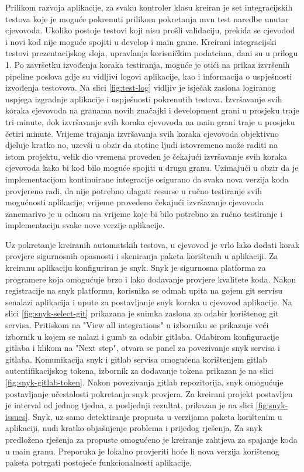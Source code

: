 \documentclass[a4paper,12pt,oneside]{article}
\begin{document}
Prilikom razvoja aplikacije, za svaku kontroler klasu kreiran je set integracijskih testova koje je moguće pokrenuti prilikom pokretanja mvn test naredbe unutar cjevovoda. Ukoliko postoje testovi koji nisu prošli validaciju, prekida se cjevodod i novi kod nije moguće spojiti u develop i main grane. Kreirani integracijski testovi prezentacijskog sloja, upravlanja korisničkim podatcima, dani su u prilogu 1. Po završetku izvođenja koraka testiranja, moguće je otići na prikaz izvršenih pipeline poslova gdje su vidljivi logovi aplikacije, kao i informacija o uspješnosti izvođenja testovova. Na slici \ref{fig:test-log} vidljiv je isječak zaslona logiranog uspjega izgradnje aplikacije i uspješnosti pokrenutih testova. Izvršavanje svih koraka cjevovoda na granama novih značajki i development grani u prosjeku traje tri minute, dok izvršavanje svih koraka cjevovoda na main grani traje u prosjeku četiri minute. Vrijeme trajanja izvršavanja svih koraka cjevovoda objektivno djeluje kratko no, uzevši u obzir da stotine ljudi istovremeno može raditi na istom projektu, velik dio vremena proveden je čekajući izvršavanje svih koraka cjevovoda kako bi kod bilo moguće spojiti u drugu granu. Uzimajući u obzir da je implementacijom kontinuirane integracije osigurano da svaka nova verzija koda provjereno radi, da nije potrebno ulagati resurse u ručno testiranje svih mogućnosti aplikacije, vrijeme provedeno čekajući izvršavanje cjevovoda zanemarivo je u odnosu na vrijeme koje bi bilo potrebno za ručno testiranje i implementaciju svake nove verzije aplikacije. 

Uz pokretanje kreiranih automatskih testova, u cjevovod je vrlo lako dodati korak provjere sigurnosnih opasnosti i skeniranja paketa korištenih u aplikaciji. Za kreiranu aplikaciju konfiguriran je snyk. Snyk je sigurnosna platforma za programere koja omogućuje brzo i lako dodavanje provjere kvalitete koda. Nakon registracije na snyk platformu, korisnika se odmah upita na gojem git servisu senalazi aplikacija i upute za postavljanje snyk koraka u cjevovod aplikacije. Na slici \ref{fig:snyk-select-git} prikazana je snimka zaslona za odabir korištenog git servisa. Pritiskom na "View all integrations" u izborniku se prikazuje veći izbornik u kojem se nalazi i gumb za odabir gitlaba. Odabirom konfiguracije gitlaba i klikom na "Next step", otvara se panel za povezivanje snyk servisa i gitlaba. Komunikacija snyk i gitlab servisa omogućena korištenjem gitlab autentifikacijskog tokena, izbornik za dodavanje tokena prikazan je na slici \ref{fig:snyk-gitlab-token}. Nakon povezivanja gitlab repozitorija, snyk omogućuje postavljanje učestalosti pokretanja snyk provjera. Za kreirani projekt postavljen je interval od jednog tjedna, a posljednji rezultat, prikazan je na slici \ref{fig:snyk-issues}. Snyk, uz samo detektiranje propusta u verzijama paketa korištenim u aplikaciji, nudi kratko objašnjenje problema i prijedog rješenja. Za snyk predložena rješenja za propuste omogućeno je kreiranje zahtjeva za spajanje koda u main granu. Preporuka je lokalno provjeriti hoće li nova verzija korištenog paketa potrgati postojeće funkcionalnosti aplikacije.
\end{document}
